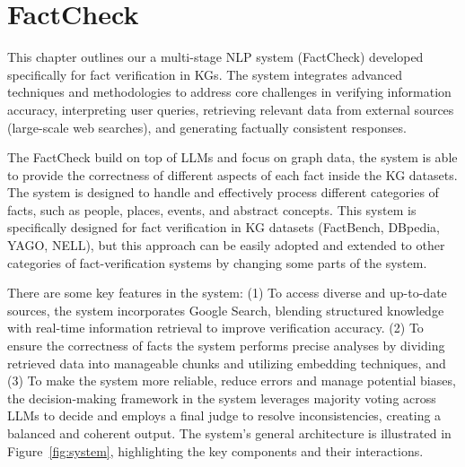 \chapter{FactCheck}\label{ch:system}
This chapter outlines our a multi-stage NLP system (FactCheck) developed specifically for fact verification in \acp{KG}.
The system integrates advanced techniques and methodologies to address core challenges in verifying information accuracy, interpreting user queries, retrieving relevant data from external sources (\eg large-scale web searches), and generating factually consistent responses.

The FactCheck build on top of \acp{LLM} and focus on graph data, the system is able to provide the correctness of different aspects of each fact inside the \ac{KG} datasets.
The system is designed to handle and effectively process different categories of facts, such as people, places, events, and abstract concepts.
This system is specifically designed for fact verification in \ac{KG} datasets (\eg FactBench, DBpedia, YAGO, NELL), but this approach can be easily adopted and extended to other categories of fact-verification systems by changing some parts of the system.

There are some key features in the system:
(1) To access diverse and up-to-date sources, the system incorporates Google Search, blending structured knowledge with real-time information retrieval to improve verification accuracy.
(2) To ensure the correctness of facts the system performs precise analyses by dividing retrieved data into manageable chunks and utilizing embedding techniques,
and (3) To make the system more reliable, reduce errors and manage potential biases, the decision-making framework in the system leverages majority voting across \acp{LLM} to decide and employs a final judge to resolve inconsistencies, creating a balanced and coherent output.
\newpage
The system's general architecture is illustrated in Figure~\ref{fig:system}, highlighting the key components and their interactions.

